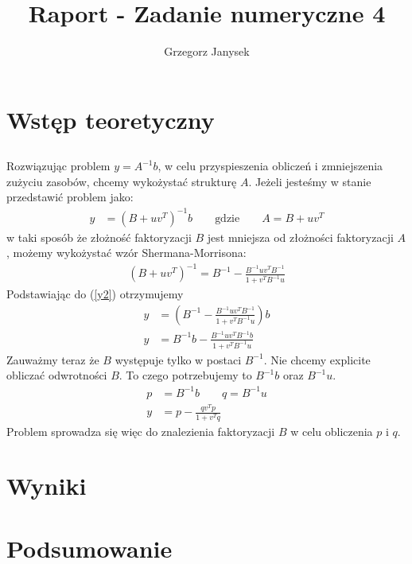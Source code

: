 \documentclass[11pt]{extarticle}
\author{Grzegorz Janysek}
\title{Raport - Zadanie numeryczne 4}
\begin{document}
	\maketitle

	\section{Wstęp teoretyczny}
	
	\subsection{}
	Rozwiązując problem \( y=A^{-1}b\), w celu przyspieszenia obliczeń i zmniejszenia zużyciu zasobów, chcemy wykożystać strukturę \( A \).
	Jeżeli jesteśmy w stanie przedstawić problem jako:
	\begin{align}
		\label{y2}
		y &= (B + uv^T)^{-1}b \qquad \text{gdzie} \qquad A = B + uv^T
	\end{align}
	w taki sposób że złożność faktoryzacji \(B\) jest mniejsza od złożności faktoryzacji \(A\),
	możemy wykożystać wzór Shermana-Morrisona:
	\begin{align}
		(B + uv^T)^{-1} = B^{-1} - \frac{ B^{-1}uv^TB^{-1} }{ 1 + v^TB^{-1}u }
	\end{align}
	Podstawiając do (\ref{y2}) otrzymujemy
	\begin{align}
		y &= \left( B^{-1} - \frac{ B^{-1}uv^TB^{-1} }{ 1 + v^TB^{-1}u } \right)b \\[12pt]
		y &= B^{-1}b - \frac{ B^{-1}uv^TB^{-1}b }{ 1 + v^TB^{-1}u }
	\end{align}
	Zauważmy teraz że \(B\) występuje tylko w postaci \(B^{-1}\).
	Nie chcemy explicite obliczać odwrotności \(B\).
	To czego potrzebujemy to \(B^{-1}b\) oraz \(B^{-1}u\).
	\begin{align}
		p &= B^{-1}b \qquad q = B^{-1}u \\[12pt]
		y &= p - \frac{ qv^Tp }{ 1 + v^Tq }
	\end{align}
	Problem sprowadza się więc do znalezienia faktoryzacji \(B\) w celu obliczenia \(p\) i \(q\).
	

	\section{Wyniki}

	\section{Podsumowanie}
\end{document}
